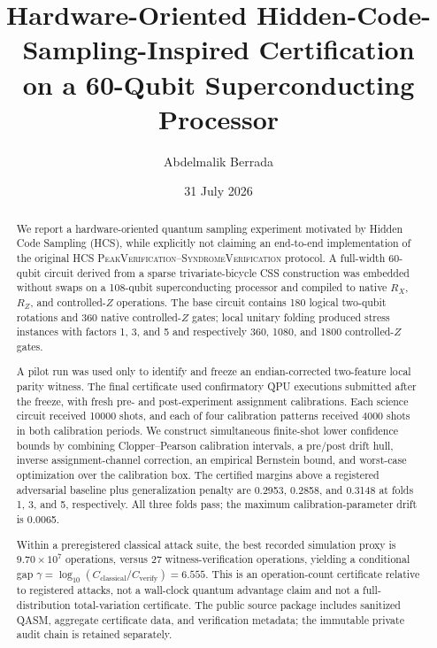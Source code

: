\documentclass[11pt]{article}
\title{\textbf{Hardware-Oriented Hidden-Code-Sampling-Inspired Certification\\on a 60-Qubit Superconducting Processor}}
\author{Abdelmalik Berrada}
\affil{Independent Researcher, Casablanca, Morocco}
\date{31 July 2026}
\begin{document}
\maketitle

\begin{abstract}
We report a hardware-oriented quantum sampling experiment motivated by Hidden Code Sampling (HCS), while explicitly not claiming an end-to-end implementation of the original HCS \textsc{PeakVerification}--\textsc{SyndromeVerification} protocol. A full-width 60-qubit circuit derived from a sparse trivariate-bicycle CSS construction was embedded without swaps on a 108-qubit superconducting processor and compiled to native $R_X$, $R_Z$, and controlled-$Z$ operations. The base circuit contains 180 logical two-qubit rotations and 360 native controlled-$Z$ gates; local unitary folding produced stress instances with factors 1, 3, and 5 and respectively 360, 1080, and 1800 controlled-$Z$ gates.

A pilot run was used only to identify and freeze an endian-corrected two-feature local parity witness. The final certificate used confirmatory QPU executions submitted after the freeze, with fresh pre- and post-experiment assignment calibrations. Each science circuit received \num{10000} shots, and each of four calibration patterns received \num{4000} shots in both calibration periods. We construct simultaneous finite-shot lower confidence bounds by combining Clopper--Pearson calibration intervals, a pre/post drift hull, inverse assignment-channel correction, an empirical Bernstein bound, and worst-case optimization over the calibration box. The certified margins above a registered adversarial baseline plus generalization penalty are 0.2953, 0.2858, and 0.3148 at folds 1, 3, and 5, respectively. All three folds pass; the maximum calibration-parameter drift is 0.0065.

Within a preregistered classical attack suite, the best recorded simulation proxy is $9.70\times10^{7}$ operations, versus 27 witness-verification operations, yielding a conditional gap $\gamma=\log_{10}(C_{\mathrm{classical}}/C_{\mathrm{verify}})=6.555$. This is an operation-count certificate relative to registered attacks, not a wall-clock quantum advantage claim and not a full-distribution total-variation certificate. The public source package includes sanitized QASM, aggregate certificate data, and verification metadata; the immutable private audit chain is retained separately.
\end{abstract}
\end{document}
